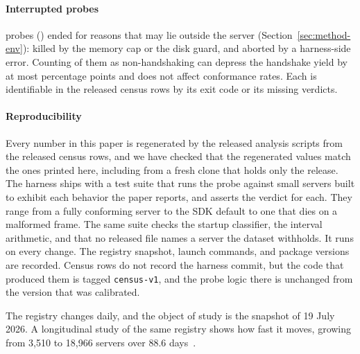 \paragraph{Interrupted probes}
\NInterrupted{} probes (\NInterruptedPct{}) ended for reasons that may lie outside the
server (Section~\ref{sec:method-env}): \NKilled{} killed by the memory cap or the disk
guard, and \NHarnessError{} aborted by a harness-side error. Counting
\NInterruptedNoHandshake{} of them as non-handshaking can depress the handshake yield by
at most \NInterruptedDepressionPP{} percentage points and does not affect
conformance rates. Each is identifiable in the released census rows by its exit code
or its missing verdicts.

\paragraph{Reproducibility}
Every number in this paper is regenerated by the released analysis scripts from the
released census rows, and we have checked that the regenerated values match the ones
printed here, including from a fresh clone that holds only the release. The harness ships with a test suite that
runs the probe against small servers built to exhibit each behavior the paper reports,
and asserts the verdict for each. They range from a fully conforming server to the SDK
default to one that dies on a malformed frame. The same suite
checks the startup classifier, the interval arithmetic, and that no released file
names a server the dataset withholds. It runs on every change. The registry snapshot, launch commands, and package versions are
recorded. Census rows do not record the harness commit, but the code that produced
them is tagged \texttt{census-v1}, and the probe logic there is unchanged from the
version that was calibrated.

The registry changes daily, and the object of study is the snapshot of
19 July 2026.
A longitudinal study of the same registry shows how fast it moves, growing from 3,510
to 18,966 servers over 88.6 days~\cite{registrydrift}.

